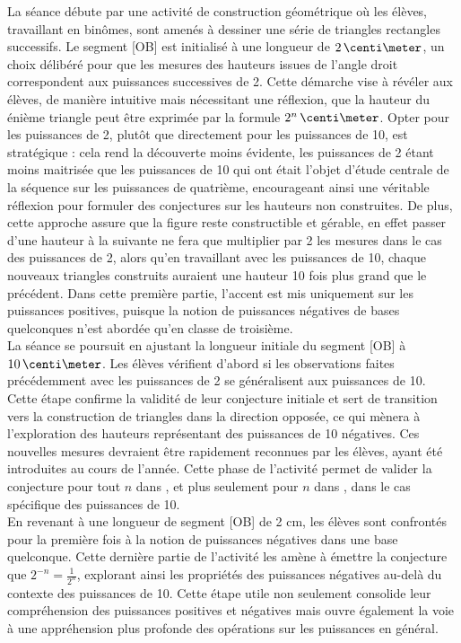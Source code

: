 La séance débute par une activité de construction géométrique où les élèves,
travaillant en binômes,
sont amenés à dessiner une série de triangles rectangles successifs.
Le segment [OB] est initialisé à une longueur de $2\cm$,
un choix délibéré pour que les mesures des hauteurs issues de l'angle droit correspondent aux puissances successives de 2.
Cette démarche vise à révéler aux élèves,
de manière intuitive mais nécessitant une réflexion,
que la hauteur du énième triangle peut être exprimée par la formule $2^n\cm$.
Opter pour les puissances de 2,
plutôt que directement pour les puissances de 10,
est stratégique :
cela rend la découverte moins évidente,
les puissances de 2 étant moins maitrisée que les puissances de 10 qui ont était l'objet d'étude centrale de la séquence sur les puissances de quatrième,
encourageant ainsi une véritable réflexion pour formuler des conjectures sur les hauteurs non construites.
De plus,
cette approche assure que la figure reste constructible et gérable,
en effet passer d'une hauteur à la suivante ne fera que multiplier par 2 les mesures dans le cas des puissances de 2,
alors qu'en travaillant avec les puissances de 10, chaque nouveaux triangles construits auraient une hauteur 10 fois plus grand que le précédent.
Dans cette première partie,
l'accent est mis uniquement sur les puissances positives,
puisque la notion de puissances négatives de bases quelconques n'est abordée qu'en classe de troisième.\\

La séance se poursuit en ajustant la longueur initiale du segment [OB] à $10\cm$.
Les élèves vérifient d'abord si les observations faites précédemment avec les puissances de 2 se généralisent aux puissances de 10.
Cette étape confirme la validité de leur conjecture initiale et sert de transition vers la construction de triangles dans la direction opposée,
ce qui mènera à l'exploration des hauteurs représentant des puissances de 10 négatives.
Ces nouvelles mesures devraient être rapidement reconnues par les élèves,
ayant été introduites au cours de l'année.
Cette phase de l'activité permet de valider la conjecture pour tout $n$ dans ,
et plus seulement pour $n$ dans ,
dans le cas spécifique des puissances de 10.\\

En revenant à une longueur de segment [OB] de 2 cm,
les élèves sont confrontés pour la première fois à la notion de puissances négatives dans une base quelconque.
Cette dernière partie de l'activité les amène à émettre la conjecture que $2^{-n}=\frac{1}{2^n}$,
explorant ainsi les propriétés des puissances négatives au-delà du contexte des puissances de 10.
Cette étape utile non seulement consolide leur compréhension des puissances positives et négatives mais ouvre également la voie à une appréhension plus profonde des opérations sur les puissances en général.

